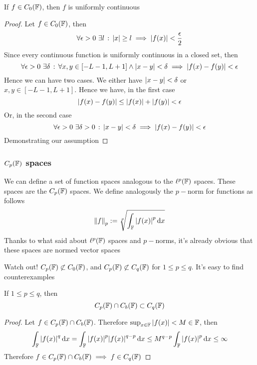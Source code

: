 \documentclass[../complete.tex]{subfiles}
\begin{document}
\begin{prop}
	If $f\in C_0(\mathbb{F})$, then $f$ is uniformly continuous
\end{prop}
\begin{proof}
	Let $f\in C_0(\mathbb{F})$, then
	\begin{equation*}
		\forall\epsilon>0\ \exists l\, :\,  \abs{x}\ge l\implies\abs{f(x)}<\frac{\epsilon}{2}
	\end{equation*}
	Since every continuous function is uniformly continuous in a closed set, then
	\begin{equation*}
		\forall\epsilon>0\ \exists\delta\st\forall x,y\in[-L-1,L+1]\wedge\abs{x-y}<\delta\implies\abs{f(x)-f(y)}<\epsilon
	\end{equation*}
	Hence we can have two cases. We either have $\abs{x-y}<\delta$ or $x,y\in[-L-1,L+1]$. Hence we have, in the first case
	\begin{equation*}
		\abs{f(x)-f(y)}\le\abs{f(x)}+\abs{f(y)}<\epsilon
	\end{equation*}
	Or, in the second case
	\begin{equation*}
		\forall\epsilon>0\ \exists\delta>0\st\abs{x-y}<\delta\implies\abs{f(x)-f(y)}<\epsilon
	\end{equation*}
	Demonstrating our assumption
\end{proof}
\subsubsection{$C_p(\mathbb{F})$ spaces}
\begin{dfn}
	We can define a set of function spaces analogous to the $\ell^p(\mathbb{F})$ spaces. These spaces are the $C_p(\mathbb{F})$ spaces. We define analogously the $p-$norm for functions as follows
	\begin{equation}
		\norm{f}_{p}:=\sqrt[p]{\int_{\mathbb{F}}\abs{f(x)}^p\operatorname{d\!}{x}}
		\label{eq:funpnorm}
	\end{equation}
	Thanks to what said about $\ell^p(\mathbb{F})$ spaces and $p-$norms, it's already obvious that these spaces are normed vector spaces
\end{dfn}
\begin{rmk}
	Watch out! $C_p(\mathbb{F})\not\subset C_0(\mathbb{F})$, and $C_p(\mathbb{F})\not\subset C_q(\mathbb{F})$ for $1\le p\le q$. It's easy to find counterexamples
\end{rmk}
\begin{prop}
	If $1\le p\le q$, then
	\begin{equation*}
		C_p(\mathbb{F})\cap C_b(\mathbb{F})\subset C_q(\mathbb{F})
	\end{equation*}
\end{prop}
\begin{proof}
	Let $f\in C_p(\mathbb{F})\cap C_b(\mathbb{F})$. Therefore $\sup_{x\in\mathbb{F}}\abs{f(x)}<M\in\mathbb{F}$, then
	\begin{equation*}
		\int_{\mathbb{F}}\abs{f(x)}^q\operatorname{d\!}{x}=\int_{\mathbb{F}}^{}\abs{f(x)}^p\abs{f(x)}^{q-p}\operatorname{d\!}{x}\le M^{q-p}\int_{\mathbb{F}}\abs{f(x)}^p\operatorname{d\!}{x}\le\infty
	\end{equation*}
	Therefore $f\in C_p(\mathbb{F})\cap C_b(\mathbb{F})\implies f\in C_q(\mathbb{F})$
\end{proof}
\end{document}
